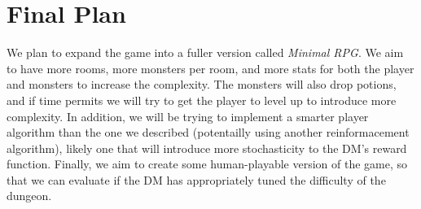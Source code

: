\documentclass{article}
\begin{document}
\section{Final Plan}
\quad \quad We plan to expand the game into a fuller version called \textit{Minimal RPG}. We aim to have more rooms, more monsters per room, and more stats for both the player and monsters to increase the complexity. The monsters will also drop potions, and if time permits we will try to get the player to level up to introduce more complexity. In addition, we will be trying to implement a smarter player algorithm than the one we described (potentailly using another reinformacement algorithm), likely one that will introduce more stochasticity to the DM's reward function. Finally, we aim to create some human-playable version of the game, so that we can evaluate if the DM has appropriately tuned the difficulty of the dungeon.

\printbibliography
\end{document}
